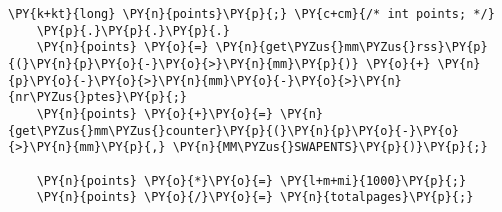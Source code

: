 \begin{Verbatim}[commandchars=\\\{\},codes={\catcode`\$=3\catcode`\^=7\catcode`\_=8}]
    \PY{k+kt}{long} \PY{n}{points}\PY{p}{;} \PY{c+cm}{/* int points; */}
    \PY{p}{.}\PY{p}{.}\PY{p}{.}
    \PY{n}{points} \PY{o}{=} \PY{n}{get\PYZus{}mm\PYZus{}rss}\PY{p}{(}\PY{n}{p}\PY{o}{-}\PY{o}{>}\PY{n}{mm}\PY{p}{)} \PY{o}{+} \PY{n}{p}\PY{o}{-}\PY{o}{>}\PY{n}{mm}\PY{o}{-}\PY{o}{>}\PY{n}{nr\PYZus{}ptes}\PY{p}{;}
    \PY{n}{points} \PY{o}{+}\PY{o}{=} \PY{n}{get\PYZus{}mm\PYZus{}counter}\PY{p}{(}\PY{n}{p}\PY{o}{-}\PY{o}{>}\PY{n}{mm}\PY{p}{,} \PY{n}{MM\PYZus{}SWAPENTS}\PY{p}{)}\PY{p}{;}

    \PY{n}{points} \PY{o}{*}\PY{o}{=} \PY{l+m+mi}{1000}\PY{p}{;}
    \PY{n}{points} \PY{o}{/}\PY{o}{=} \PY{n}{totalpages}\PY{p}{;}
\end{Verbatim}
